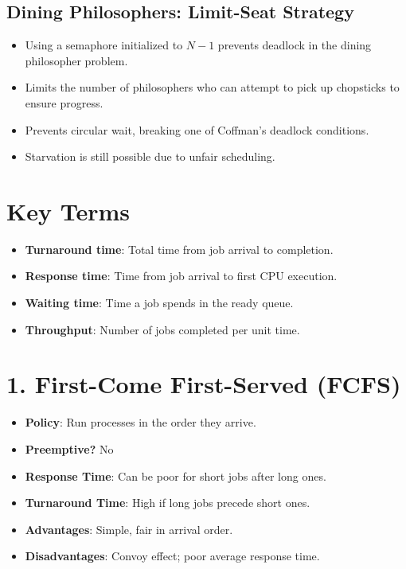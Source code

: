 \documentclass[12pt]{article}
\begin{document}
\subsection*{Dining Philosophers: Limit-Seat Strategy}

\begin{itemize}
    \item Using a semaphore initialized to \( N - 1 \) prevents deadlock in the dining philosopher problem.
    \item Limits the number of philosophers who can attempt to pick up chopsticks to ensure progress.
    \item Prevents circular wait, breaking one of Coffman’s deadlock conditions.
    \item Starvation is still possible due to unfair scheduling.
\end{itemize}
\section*{Key Terms}
\begin{itemize}
    \item \textbf{Turnaround time}: Total time from job arrival to completion.
    \item \textbf{Response time}: Time from job arrival to first CPU execution.
    \item \textbf{Waiting time}: Time a job spends in the ready queue.
    \item \textbf{Throughput}: Number of jobs completed per unit time.
\end{itemize}

\section*{1. First-Come First-Served (FCFS)}

\begin{itemize}
    \item \textbf{Policy}: Run processes in the order they arrive.
    \item \textbf{Preemptive?} No
    \item \textbf{Response Time}: Can be poor for short jobs after long ones.
    \item \textbf{Turnaround Time}: High if long jobs precede short ones.
    \item \textbf{Advantages}: Simple, fair in arrival order.
    \item \textbf{Disadvantages}: Convoy effect; poor average response time.
\end{itemize}
\end{document}
